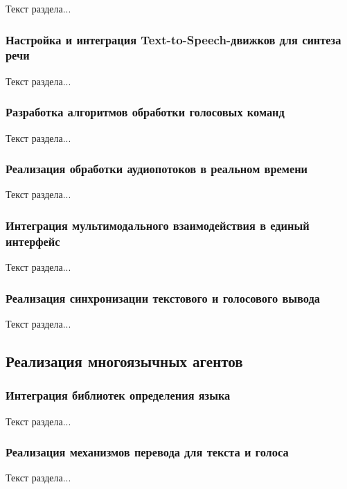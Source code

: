 Текст раздела...

\subsubsection{Настройка и интеграция Text-to-Speech-движков для синтеза речи}

Текст раздела...

\subsubsection{Разработка алгоритмов обработки голосовых команд}

Текст раздела...

\subsubsection{Реализация обработки аудиопотоков в реальном времени}

Текст раздела...

\subsubsection{Интеграция мультимодального взаимодействия в единый интерфейс}

Текст раздела...

\subsubsection{Реализация синхронизации текстового и голосового вывода}

Текст раздела...

\subsection{Реализация многоязычных агентов}

\subsubsection{Интеграция библиотек определения языка}

Текст раздела...

\subsubsection{Реализация механизмов перевода для текста и голоса}

Текст раздела...

